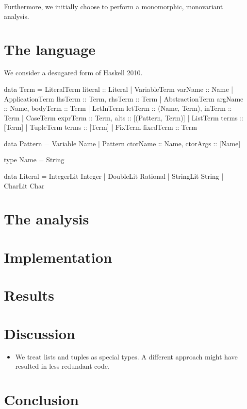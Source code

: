 \documentclass[a4paper]{scrartcl}
\begin{document}
Furthermore, we initially choose to perform a monomorphic, monovariant analysis.

\section{The language}
We consider a desugared form of Haskell 2010.

\begin{code}
data Term = LiteralTerm     {literal :: Literal}
          | VariableTerm    {varName :: Name}
          | ApplicationTerm {lhsTerm :: Term, rhsTerm :: Term}
          | AbstractionTerm {argName :: Name, bodyTerm :: Term}
          | LetInTerm       {letTerm :: (Name, Term), inTerm :: Term}
          | CaseTerm        {exprTerm :: Term, alts :: [(Pattern, Term)]}
          | ListTerm        {terms :: [Term]}
          | TupleTerm       {terms :: [Term]}
          | FixTerm         {fixedTerm :: Term}

data Pattern = Variable Name
             | Pattern {ctorName :: Name, ctorArgs :: [Name]}

type Name = String

data Literal = IntegerLit Integer
             | DoubleLit Rational
             | StringLit String
             | CharLit Char
\end{code}


\section{The analysis}


\section{Implementation}
\section{Results}
\section{Discussion}
\begin{itemize}
\item
    We treat lists and tuples as special types. A different approach might
    have resulted in less redundant code.
\end{itemize}

\section{Conclusion}
\end{document}
